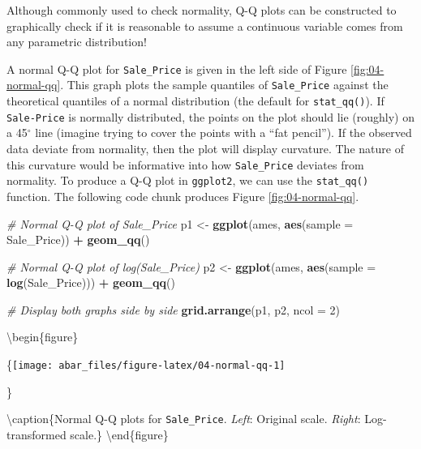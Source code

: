 \documentclass[]{book}
\newenvironment{Shaded}{\begin{snugshade}}{\end{snugshade}}
\newcommand{\CommentTok}[1]{\textcolor[rgb]{0.56,0.35,0.01}{\textit{#1}}}
\newcommand{\DataTypeTok}[1]{\textcolor[rgb]{0.13,0.29,0.53}{#1}}
\newcommand{\DecValTok}[1]{\textcolor[rgb]{0.00,0.00,0.81}{#1}}
\newcommand{\KeywordTok}[1]{\textcolor[rgb]{0.13,0.29,0.53}{\textbf{#1}}}
\newcommand{\NormalTok}[1]{#1}
\newcommand{\OperatorTok}[1]{\textcolor[rgb]{0.81,0.36,0.00}{\textbf{#1}}}
\newcommand{\StringTok}[1]{\textcolor[rgb]{0.31,0.60,0.02}{#1}}
\theoremstyle{definition}
\theoremstyle{definition}
\theoremstyle{definition}
\theoremstyle{remark}
\let\BeginKnitrBlock\begin \let\EndKnitrBlock\end
\begin{document}
\BeginKnitrBlock{note}
Although commonly used to check normality, Q-Q plots can be constructed
to graphically check if it is reasonable to assume a continuous variable
comes from any parametric distribution!
\EndKnitrBlock{note}

A normal Q-Q plot for \texttt{Sale\_Price} is given in the left side of
Figure \ref{fig:04-normal-qq}. This graph plots the sample quantiles of
\texttt{Sale\_Price} against the theoretical quantiles of a normal
distribution (the default for \texttt{stat\_qq()}). If
\texttt{Sale-Price} is normally distributed, the points on the plot
should lie (roughly) on a 45\(^\circ\) line (imagine trying to cover the
points with a ``fat pencil''). If the observed data deviate from
normality, then the plot will display curvature. The nature of this
curvature would be informative into how \texttt{Sale\_Price} deviates
from normality. To produce a Q-Q plot in \texttt{ggplot2}, we can use
the \texttt{stat\_qq()} function. The following code chunk produces
Figure \ref{fig:04-normal-qq}.

\begin{Shaded}
\begin{Highlighting}[]
\CommentTok{# Normal Q-Q plot of Sale_Price}
\NormalTok{p1 <-}\StringTok{ }\KeywordTok{ggplot}\NormalTok{(ames, }\KeywordTok{aes}\NormalTok{(}\DataTypeTok{sample =}\NormalTok{ Sale_Price)) }\OperatorTok{+}\StringTok{ }
\StringTok{  }\KeywordTok{geom_qq}\NormalTok{()}

\CommentTok{# Normal Q-Q plot of log(Sale_Price)}
\NormalTok{p2 <-}\StringTok{ }\KeywordTok{ggplot}\NormalTok{(ames, }\KeywordTok{aes}\NormalTok{(}\DataTypeTok{sample =} \KeywordTok{log}\NormalTok{(Sale_Price))) }\OperatorTok{+}\StringTok{ }
\StringTok{  }\KeywordTok{geom_qq}\NormalTok{()}

\CommentTok{# Display both graphs side by side}
\KeywordTok{grid.arrange}\NormalTok{(p1, p2, }\DataTypeTok{ncol =} \DecValTok{2}\NormalTok{)}
\end{Highlighting}
\end{Shaded}

\textbackslash{}begin\{figure\}

\{\centering \texttt{[image: abar\_files/figure-latex/04-normal-qq-1]}

\}

\textbackslash{}caption\{Normal Q-Q plots for \texttt{Sale\_Price}.
\emph{Left}: Original scale. \emph{Right}: Log-transformed
scale.\}\label{fig:04-normal-qq} \textbackslash{}end\{figure\}
\end{document}
